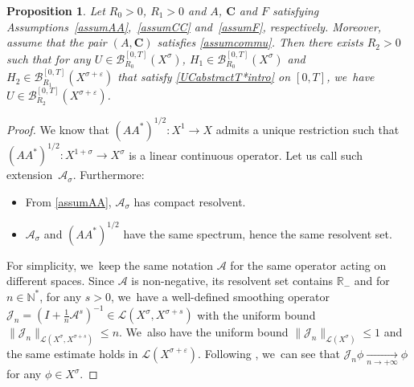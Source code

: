 \documentclass[JEP,XML,SOM,Unicode,published]{cedram}
\newtheorem{proposition}[theorem]{Proposition}
\theoremstyle{definition}
\let\mc\mathcal
\let\veps\varepsilon
\newcommand{\A}{\mc{A}}
\newcommand{\B}{\mc{B}}
\newcommand{\J}{\mc{J}}
\newcommand{\R}{\mathbb{R}}
\newcommand{\N}{\mathbb{N}}
\newcommand{\bC}{\boldsymbol{C}}
\providecommand{\norm}[1]{\lVert#1\rVert}
\begin{document}
\begin{proposition}\label{prop:abs-prop-reg}
Let $R_{0}>0$, $R_{1}>0$ and $A$, $\bC$ and $F$ satisfying Assumptions~\ref{assumAA},~\ref{assumCC} and~\ref{assumF}, respectively. Moreover, assume that the pair $(A, \bC)$ satisfies \cref{assumcommu}. Then there exists $R_{2}>0$ such that for any
$U\in \B_{R_{0}}^{[0,T]}(X^{\sigma})$, $H_{1}\in \B_{R_{0}}^{[0,T]}(X^{\sigma})$ and $H_{2}\in \B_{R_{1}}^{[0,T]}(X^{\sigma+\veps})$ that satisfy \eqref{UCabstractT*intro} on $[0,T]$, we~have $U\in \B_{R_{2}}^{[0,T]}(X^{\sigma+\veps})$.
\end{proposition}
\begin{proof}

We know that $(AA^*)^{1/2}: X^1\to X$ admits a unique restriction such that $(AA^*)^{1/2}: X^{1+\sigma}\to X^{\sigma}$ is a linear continuous operator. Let us call such extension~$\A_\sigma$. Furthermore:
\begin{itemize}
\item From \cref{assumAA}, $\A_\sigma$ has compact resolvent.
\item $\A_\sigma$ and $(AA^*)^{1/2}$ have the same spectrum, hence the same resolvent set.
\end{itemize}
For simplicity, we~keep the same notation $\A$ for the same operator acting on different spaces. Since $\A$ is non-negative, its resolvent set contains $\R_-$ and for $n\in \N^*$, for any $s>0$, we~have a well-defined smoothing operator $\mc{J}_n=(I+\frac{1}{n}\A^s)^{-1}\in \mc{L}(X^\sigma, X^{\sigma+s})$ with the uniform bound $\norm{\mc{J}_n}_{\mc{L}(X^\sigma, X^{\sigma+s})}\leq n$. We~also have the uniform bound $\norm{\mc{J}_n}_{\mc{L}(X^\sigma)}\leq 1$ and the same estimate holds in $\mc{L}(X^{\sigma+\veps})$. Following \cite[Prop.\,2.3.4]{TW:09}, we~can see that $\J_n \phi\underset{n\to+\infty}{\to} \phi$ for any $\phi\in X^\sigma$.


\end{proof}
\end{document}
